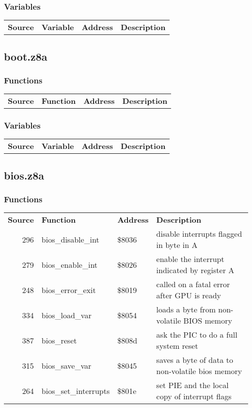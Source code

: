 \subsubsection{Variables}
\begin{tabular}{rllp{7cm}}
 \textbf{Source}&\textbf{Variable}&\textbf{Address}&\textbf{Description}\\
\end{tabular}

\subsection{boot.z8a}
\subsubsection{Functions}
\begin{tabular}{rllp{7cm}}
 \textbf{Source}&\textbf{Function}&\textbf{Address}&\textbf{Description}\\
\end{tabular}

\subsubsection{Variables}
\begin{tabular}{rllp{7cm}}
 \textbf{Source}&\textbf{Variable}&\textbf{Address}&\textbf{Description}\\
\end{tabular}

\subsection{bios.z8a}
\subsubsection{Functions}
\begin{tabular}{rllp{7cm}}
 \textbf{Source}&\textbf{Function}&\textbf{Address}&\textbf{Description}\\
 296&bios\_disable\_int&\$8036&disable interrupts flagged in byte in A\\
 279&bios\_enable\_int&\$8026&enable the interrupt indicated by register A\\
 248&bios\_error\_exit&\$8019&called on a fatal error after GPU is ready\\
 334&bios\_load\_var&\$8054&loads a byte from non-volatile BIOS memory\\
 387&bios\_reset&\$808d&ask the PIC to do a full system reset\\
 315&bios\_save\_var&\$8045&saves a byte of data to non-volatile bios memory\\
 264&bios\_set\_interrupts&\$801e&set PIE and the local copy of interrupt flags\\
\end{tabular}

